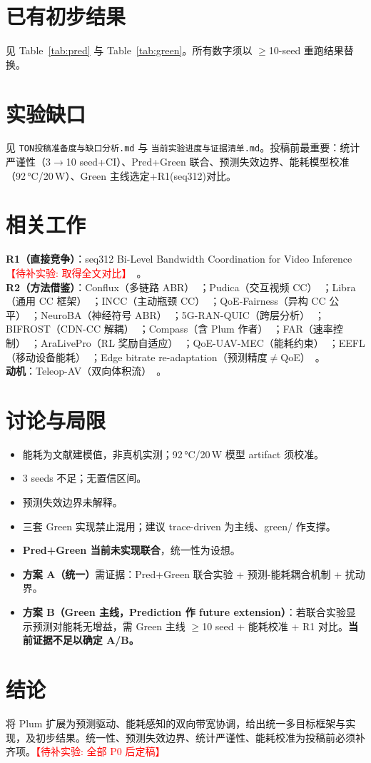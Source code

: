 \documentclass[journal,10pt]{IEEEtran}
\newcommand{\todoexp}[1]{\textcolor{red}{【待补实验: #1】}}
\begin{document}
\section{已有初步结果}
见 Table~\ref{tab:pred} 与 Table~\ref{tab:green}。所有数字须以 $\geq$10-seed 重跑结果替换。

\section{实验缺口}
见 \texttt{TON投稿准备度与缺口分析.md} 与 \texttt{当前实验进度与证据清单.md}。投稿前最重要：统计严谨性（3$\to$10 seed+CI）、Pred+Green 联合、预测失效边界、能耗模型校准（92\,°C/20\,W）、Green 主线选定+R1(seq312)对比。

\section{相关工作}
\textbf{R1（直接竞争）}：seq312 Bi-Level Bandwidth Coordination for Video Inference\todoexp{取得全文对比}~\cite{ton0312}。\\
\textbf{R2（方法借鉴）}：Conflux（多链路 ABR）~\cite{ton0191}；Pudica（交互视频 CC）~\cite{ton0066}；Libra（通用 CC 框架）~\cite{ton0033}；INCC（主动瓶颈 CC）~\cite{ton0231}；QoE-Fairness（异构 CC 公平）~\cite{ton0383}；NeuroBA（神经符号 ABR）~\cite{ton0442}；5G-RAN-QUIC（跨层分析）~\cite{ton0420}；BIFROST（CDN-CC 解耦）~\cite{ton0450}；Compass（含 Plum 作者）~\cite{ton0495}；FAR（速率控制）~\cite{ton0467}；AraLivePro（RL 奖励自适应）~\cite{ton0583}；QoE-UAV-MEC（能耗约束）~\cite{ton0205}；EEFL（移动设备能耗）~\cite{ton0534}；Edge bitrate re-adaptation（预测精度$\neq$QoE）~\cite{ton0491}。\\
\textbf{动机}：Teleop-AV（双向体积流）~\cite{ton0580}。

\section{讨论与局限}
\begin{itemize}
  \item 能耗为文献建模值，非真机实测；92\,°C/20\,W 模型 artifact 须校准。
  \item 3 seeds 不足；无置信区间。
  \item 预测失效边界未解释。
  \item 三套 Green 实现禁止混用；建议 trace-driven 为主线、green/ 作支撑。
  \item \textbf{Pred+Green 当前未实现联合}，统一性为设想。
  \item \textbf{方案 A（统一）}需证据：Pred+Green 联合实验 + 预测-能耗耦合机制 + 扰动界。
  \item \textbf{方案 B（Green 主线，Prediction 作 future extension）}：若联合实验显示预测对能耗无增益，需 Green 主线 $\geq$10 seed + 能耗校准 + R1 对比。\textbf{当前证据不足以确定 A/B。}
\end{itemize}

\section{结论}
将 Plum 扩展为预测驱动、能耗感知的双向带宽协调，给出统一多目标框架与实现，及初步结果。统一性、预测失效边界、统计严谨性、能耗校准为投稿前必须补齐项。\todoexp{全部 P0 后定稿}



\end{document}
